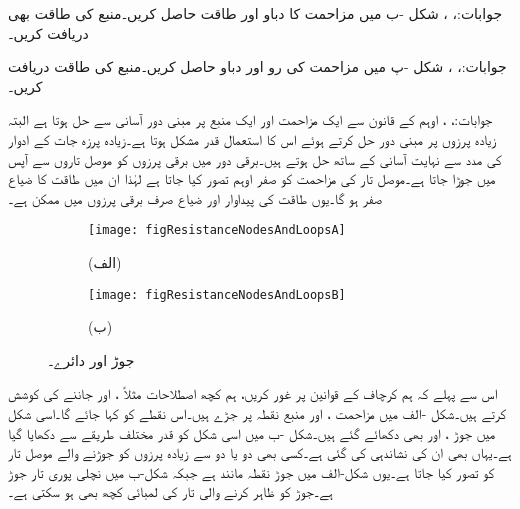 جوابات:، ، 
شکل -ب میں مزاحمت کا دباو اور طاقت حاصل کریں۔منبع کی طاقت بھی دریافت کریں۔

جوابات:، ، 
شکل -پ میں مزاحمت کی رو اور دباو حاصل کریں۔منبع کی طاقت دریافت کریں۔

جوابات:، ، 
\FloatBarrier
{}
اوہم کے قانون سے ایک مزاحمت اور ایک منبع پر مبنی دور آسانی سے حل ہوتا ہے البتہ زیادہ  پرزوں پر مبنی دور حل کرتے ہوئے اس کا استعمال قدر مشکل ہوتا ہے۔زیادہ پرزہ جات کے ادوار  کی مدد سے نہایت آسانی کے ساتھ حل ہوتے ہیں۔برقی دور میں برقی پرزوں کو موصل تاروں سے آپس میں جوڑا جاتا ہے۔موصل تار کی مزاحمت کو صفر اوہم تصور کیا جاتا ہے لہٰذا ان میں طاقت کا ضیاع صفر ہو گا۔یوں طاقت کی  پیداوار اور ضیاع صرف برقی پرزوں میں ممکن ہے۔

\begin{figure}
\centering
\begin{subfigure}{0.5\textwidth}
\centering
\texttt{[image: figResistanceNodesAndLoopsA]}
\caption*{(الف)}
\end{subfigure}%
%
\begin{subfigure}{0.5\textwidth}
\centering
\texttt{[image: figResistanceNodesAndLoopsB]}
\caption*{(ب)}%
\end{subfigure}
\caption{جوڑ اور دائرے۔}
\label{شکل_مزاحمتی_جوڑ_دائرہ}
\end{figure}

اس سے پہلے کہ ہم کرچاف کے قوانین پر غور کریں، ہم کچھ اصطلاحات مثلاً ،  اور  جاننے کی کوشش کرتے ہیں۔شکل -الف میں مزاحمت ،  اور منبع  نقطہ  پر جڑے ہیں۔اس نقطے کو   کہا جائے گا۔اسی شکل میں جوڑ ،  اور  بھی دکھائے گئے ہیں۔شکل -ب میں اسی شکل کو قدر مختلف طریقے سے  دکھایا گیا ہے۔یہاں بھی ان  کی نشاندہی کی گئی ہے۔کسی بھی دو یا دو سے زیادہ پرزوں کو جوڑنے والے موصل تار کو  تصور کیا جاتا ہے۔یوں شکل-الف میں جوڑ  نقطہ مانند ہے جبکہ شکل-ب میں نچلی پوری تار جوڑ  ہے۔جوڑ کو ظاہر کرنے والی تار کی لمبائی کچھ بھی ہو سکتی ہے۔

